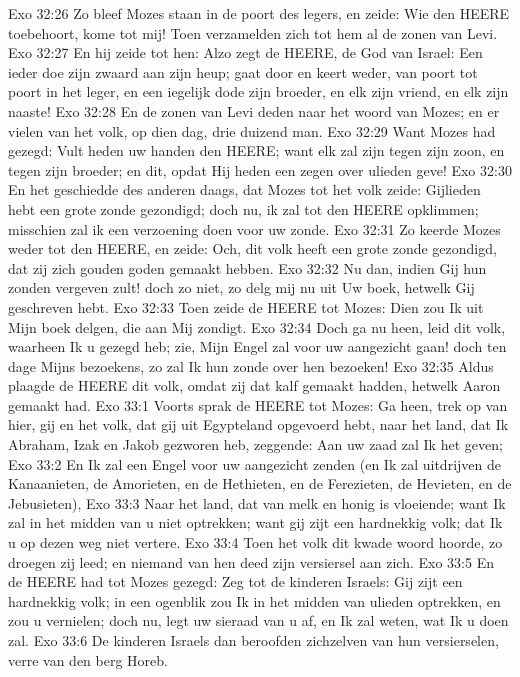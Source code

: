Exo 32:26  Zo bleef Mozes staan in de poort des legers, en zeide: Wie den HEERE toebehoort, kome tot mij! Toen verzamelden zich tot hem al de zonen van Levi.
Exo 32:27  En hij zeide tot hen: Alzo zegt de HEERE, de God van Israel: Een ieder doe zijn zwaard aan zijn heup; gaat door en keert weder, van poort tot poort in het leger, en een iegelijk dode zijn broeder, en elk zijn vriend, en elk zijn naaste!
Exo 32:28  En de zonen van Levi deden naar het woord van Mozes; en er vielen van het volk, op dien dag, drie duizend man.
Exo 32:29  Want Mozes had gezegd: Vult heden uw handen den HEERE; want elk zal zijn tegen zijn zoon, en tegen zijn broeder; en dit, opdat Hij heden een zegen over ulieden geve!
Exo 32:30  En het geschiedde des anderen daags, dat Mozes tot het volk zeide: Gijlieden hebt een grote zonde gezondigd; doch nu, ik zal tot den HEERE opklimmen; misschien zal ik een verzoening doen voor uw zonde.
Exo 32:31  Zo keerde Mozes weder tot den HEERE, en zeide: Och, dit volk heeft een grote zonde gezondigd, dat zij zich gouden goden gemaakt hebben.
Exo 32:32  Nu dan, indien Gij hun zonden vergeven zult! doch zo niet, zo delg mij nu uit Uw boek, hetwelk Gij geschreven hebt.
Exo 32:33  Toen zeide de HEERE tot Mozes: Dien zou Ik uit Mijn boek delgen, die aan Mij zondigt.
Exo 32:34  Doch ga nu heen, leid dit volk, waarheen Ik u gezegd heb; zie, Mijn Engel zal voor uw aangezicht gaan! doch ten dage Mijns bezoekens, zo zal Ik hun zonde over hen bezoeken!
Exo 32:35  Aldus plaagde de HEERE dit volk, omdat zij dat kalf gemaakt hadden, hetwelk Aaron gemaakt had.
Exo 33:1  Voorts sprak de HEERE tot Mozes: Ga heen, trek op van hier, gij en het volk, dat gij uit Egypteland opgevoerd hebt, naar het land, dat Ik Abraham, Izak en Jakob gezworen heb, zeggende: Aan uw zaad zal Ik het geven;
Exo 33:2  En Ik zal een Engel voor uw aangezicht zenden (en Ik zal uitdrijven de Kanaanieten, de Amorieten, en de Hethieten, en de Ferezieten, de Hevieten, en de Jebusieten),
Exo 33:3  Naar het land, dat van melk en honig is vloeiende; want Ik zal in het midden van u niet optrekken; want gij zijt een hardnekkig volk; dat Ik u op dezen weg niet vertere.
Exo 33:4  Toen het volk dit kwade woord hoorde, zo droegen zij leed; en niemand van hen deed zijn versiersel aan zich.
Exo 33:5  En de HEERE had tot Mozes gezegd: Zeg tot de kinderen Israels: Gij zijt een hardnekkig volk; in een ogenblik zou Ik in het midden van ulieden optrekken, en zou u vernielen; doch nu, legt uw sieraad van u af, en Ik zal weten, wat Ik u doen zal.
Exo 33:6  De kinderen Israels dan beroofden zichzelven van hun versierselen, verre van den berg Horeb.
